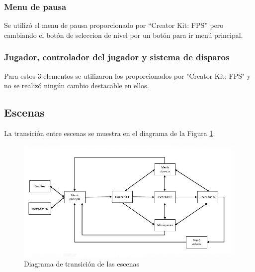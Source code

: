 \subsubsection{Menu de pausa}
Se utilizó el menu de pausa proporcionado por ``Creator Kit: FPS'' pero cambiando el botón de seleccion de nivel por un botón para ir menú principal.

\subsubsection{Jugador, controlador del jugador y sistema de disparos}
Para estos 3 elementos se utilizaron los proporcionados por "Creator Kit: FPS" y no se realizó ningún cambio destacable en ellos.

\subsection{Escenas}

La transición entre escenas se muestra en el diagrama de la Figura \ref{fig:TrasicionEscenas3D}. 

\begin{figure}[H]
	\centering
	\includegraphics[scale=0.60]{imagenes/transicionEscenas3D.png}
	\caption{\label{fig:TrasicionEscenas3D}Diagrama de transición de las escenas}
\end{figure}

